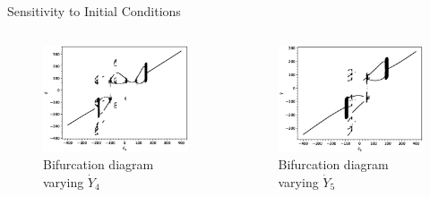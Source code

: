 \documentclass{beamer}
\begin{document}
\begin{frame}{Sensitivity to Initial Conditions}
	\begin{columns}
	\begin{column}{0.5\textwidth}
		\begin{figure}
			\centering
			\includegraphics[width=1.2\textwidth]{y4bifurcation.eps}
			\caption{Bifurcation diagram varying $\dot Y_4$}
		\end{figure}
	\end{column}
	\begin{column}{0.5\textwidth}
		\begin{figure}
			\centering
			\includegraphics[width=1.2\textwidth]{y5bifurcation.eps}
			\caption{Bifurcation diagram varying $\dot Y_5$}
		\end{figure}
	\end{column}
	\end{columns}
\end{frame}
\end{document}
